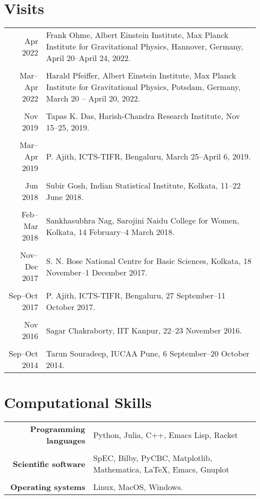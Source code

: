 \documentclass[10pt]{article}
\begin{document}
\section*{Visits}
\begin{longtable}{rp{14cm}}
Apr 2022 & Frank Ohme, Albert Einstein Institute, Max Planck Institute for Gravitational Physics, Hannover, Germany, April 20--April 24, 2022.\\\\
Mar--Apr 2022 & Harald Pfeiffer, Albert Einstein Institute, Max Planck Institute for Gravitational Physics, Potsdam, Germany, March 20 -- April 20, 2022.\\\\
Nov 2019 & Tapas K. Das, Harish-Chandra Research Institute, Nov 15--25, 2019.\\\\
Mar--Apr 2019 & P. Ajith, ICTS-TIFR, Bengaluru, March 25--April 6, 2019.\\\\
Jun 2018 & Subir Gosh, Indian Statistical Institute, Kolkata, 11--22 June 2018.\\\\
Feb--Mar 2018 & Sankhasubhra Nag, Sarojini Naidu College for Women, Kolkata, 14 February--4 March 2018.\\\\
Nov--Dec 2017 & S. N. Bose National Centre for Basic Sciences, Kolkata, 18 November--1 December 2017.\\\\
Sep--Oct 2017 & P. Ajith, ICTS-TIFR, Bengaluru, 27 September--11 October 2017.\\\\
Nov 2016 & Sagar Chakraborty, IIT Kanpur, 22--23 November 2016.\\\\
Sep--Oct 2014 & Tarun Souradeep, IUCAA Pune, 6 September--20 October 2014.
\end{longtable}

\section*{Computational Skills}
\begin{longtable}{rp{14cm}}
{\bfseries Programming languages} & Python, Julia, C++, Emacs Lisp, Racket\\\\
{\bfseries Scientific software} & SpEC, Bilby, PyCBC, Matplotlib, Mathematica, \LaTeX, Emacs, Gnuplot\\\\
{\bfseries Operating systems} & Linux, MacOS, Windows.
\end{longtable}
\end{document}
